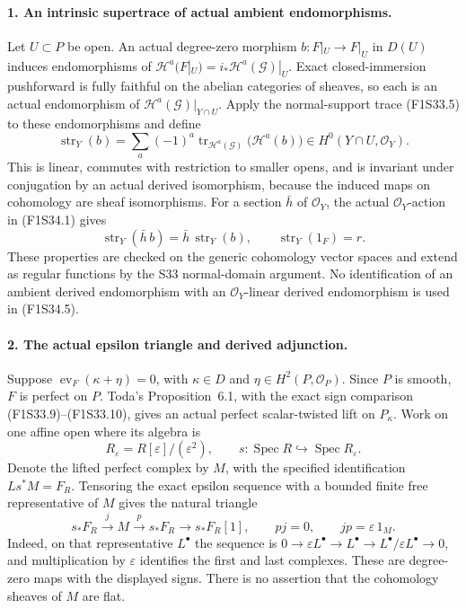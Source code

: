 \paragraph{1. An intrinsic supertrace of actual ambient endomorphisms.}
Let $U\subset P$ be open. An actual degree-zero
morphism
$b:F|_U\to F|_U$ in $D(U)$ induces endomorphisms
of
$\mathcal H^a(F|_U)=i_*\mathcal H^a(\mathcal G)|_U$.
Exact closed-immersion pushforward is fully
faithful on the abelian categories of sheaves,
so each is an actual endomorphism of
$\mathcal H^a(\mathcal G)|_{Y\cap U}$.
Apply the normal-support trace (F1S33.5) to these
endomorphisms and define
\[
 \operatorname{str}_Y(b)=
       \sum_a(-1)^a
       \operatorname{tr}_{\mathcal H^a(\mathcal G)}
                             \bigl(\mathcal H^a(b)\bigr)
           \in H^0(Y\cap U,\mathcal O_Y).
 \tag{F1S34.5}
\]
This is linear, commutes with restriction to
smaller opens, and is invariant under
conjugation by an actual derived isomorphism,
because the induced maps on cohomology are
sheaf isomorphisms.
For a section $\bar h$ of $\mathcal O_Y$,
the actual $\mathcal O_Y$-action in
(F1S34.1) gives
\[
 \operatorname{str}_Y(\bar h\,b)=
         \bar h\,\operatorname{str}_Y(b),\qquad
              \operatorname{str}_Y(1_F)=r.
 \tag{F1S34.6}
\]
These properties are checked on the generic
cohomology vector spaces and extend as regular
functions by the S33 normal-domain argument.
No identification of an ambient derived
endomorphism with an $\mathcal O_Y$-linear
derived endomorphism is used in (F1S34.5).

\paragraph{2. The actual epsilon triangle and derived adjunction.}
Suppose
$\operatorname{ev}_F(\kappa+\eta)=0$,
with $\kappa\in D$ and $\eta\in H^2(P,\mathcal O_P)$.
Since $P$ is smooth, $F$ is perfect on $P$.
Toda's Proposition~6.1, with the exact sign
comparison (F1S33.9)--(F1S33.10), gives an
actual perfect scalar-twisted lift on $P_\kappa$.
Work on one affine open where its algebra is
\[
 R_\varepsilon=R[\varepsilon]/(\varepsilon^2),
 \qquad s:\operatorname{Spec}R\hookrightarrow
                         \operatorname{Spec}R_\varepsilon.
 \tag{F1S34.7}
\]
Denote the lifted perfect complex by $M$, with
the specified identification $Ls^*M=F_R$.
Tensoring the exact epsilon sequence with a
bounded finite free representative of $M$
gives the natural triangle
\[
 s_*F_R\xrightarrow{\,j\,}M\xrightarrow{\,p\,}
       s_*F_R\longrightarrow s_*F_R[1],
 \qquad pj=0,\qquad jp=\varepsilon\,1_M.
 \tag{F1S34.8}
\]
Indeed, on that representative $L^\bullet$ the
sequence is
$0\to\varepsilon L^\bullet\to L^\bullet
 \to L^\bullet/\varepsilon L^\bullet\to0$,
and multiplication by $\varepsilon$ identifies
the first and last complexes. These are
degree-zero maps with the displayed signs.
There is no assertion that the cohomology
sheaves of $M$ are flat.

